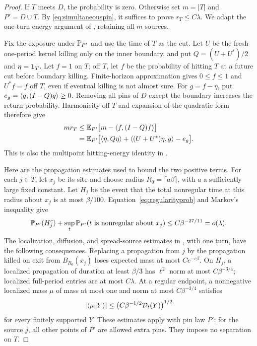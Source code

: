\begin{proof}
If $T$ meets $D$, the probability is zero.  Otherwise set $m=|T|$ and
$P'=D\cup T$.  By \eqref{eq:simultaneouspin}, it suffices to prove
$r_T\le C\lambda$.  We adapt the one-turn energy argument of
\cite[Section~4]{BlochLaw}, retaining all $m$ sources.

Fix the exposure under $\mathbb P_{P'}$ and use the time of $T$ as the cut.
Let $U$ be the fresh one-period kernel killing only on the inner
boundary, and put $Q=(U+U^*)/2$ and $\eta=\mathbf 1_T$.  Let $f=1$ on $T$;
off $T$, let $f$ be the probability of hitting $T$ at a future cut
before boundary killing.  Finite-horizon approximation gives
$0\le f\le1$ and $U^*f=f$ off $T$, even if eventual killing is not
almost sure.  For $g=f-\eta$, put $e_g=\langle g,(I-Q)g\rangle\ge0$.
Removing all pins of $D$ except the boundary increases the return
probability.  Harmonicity off $T$ and expansion of the quadratic form
therefore give
\begin{align}
 m r_T
 &\le\mathbb E_{P'}\bigl[m-\langle f,(I-Q)f\rangle\bigr]\notag\\
 &=\mathbb E_{P'}\bigl[
      \langle \eta,Q\eta\rangle+\langle (U+U^*)\eta,g\rangle-e_g\bigr].
 \label{eq:snapshotenergy}
\end{align}
This is also the multipoint hitting-energy identity in
\cite[Lemma~4.5]{Ordering}.

Here are the propagation estimates used to bound the two positive
terms.  For each $j\in T$, let $x_j$ be its site and choose radius
$R_0=\lceil a\beta\rceil$, with $a$ a sufficiently large fixed
constant.  Let $H_j$ be the event that the total nonregular time at this
radius about $x_j$ is at most $\beta/100$.
Equation~\eqref{eq:regularityprob} and Markov's inequality give
\begin{equation}\label{eq:bootstrapbad}
 \mathbb P_{P'}(H_j^c)+
 \sup_t\mathbb P_{P'}(t\text{ is nonregular about }x_j)
       \le C\beta^{-27/11}=o(\lambda).
\end{equation}
The localization, diffusion, and spread-source estimates in
\cite[Lemma~4.4 and Propositions~4.5 and~3.7]{BlochLaw}, with one turn, have the following
consequences.  Replacing a propagation from $j$ by the propagation killed
on exit from $B_{R_0}(x_j)$ loses expected mass at most $Ce^{-c\beta}$.
On $H_j$, a localized propagation of duration at least $\beta/3$ has
$\ell^2$ norm at most $C\beta^{-3/4}$; localized full-period entries are at most
$C\lambda$.  At a regular endpoint, a nonnegative localized mass $\mu$
of mass at most one and norm at most $C\beta^{-3/4}$ satisfies
\begin{equation}\label{eq:bootstrapspread}
 |\langle \mu,Y\rangle|\le
                 \bigl(C\beta^{-1/2}\mathcal D_t(Y)\bigr)^{1/2}
\end{equation}
for every finitely supported $Y$.  These estimates apply with pin law
$P'$: for the source $j$, all other points of $P'$ are allowed extra
pins.  They impose no separation on $T$.


\end{proof}
